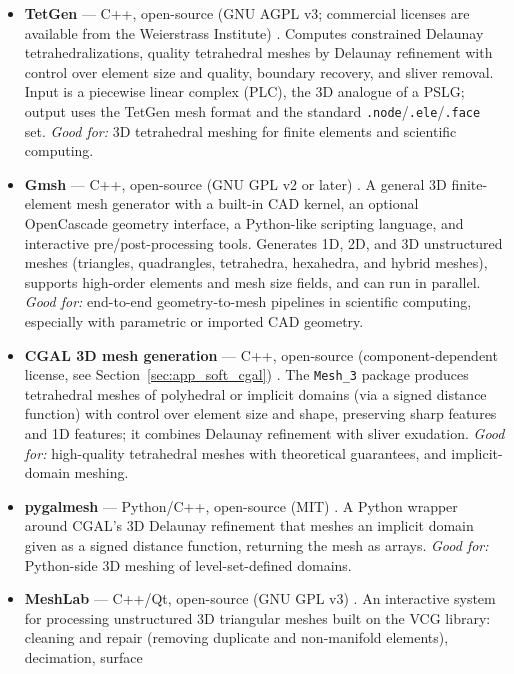\begin{itemize}
  \item \textbf{TetGen} --- C++, open-source (GNU AGPL v3; commercial
    licenses are available from the Weierstrass Institute)
    \cite{si2015}. Computes constrained Delaunay tetrahedralizations,
    quality tetrahedral meshes by Delaunay refinement with control over
    element size and quality, boundary recovery, and sliver removal.
    Input is a piecewise linear complex (PLC), the 3D analogue of a
    PSLG; output uses the TetGen mesh format and the standard
    \texttt{.node}/\texttt{.ele}/\texttt{.face} set.
    \emph{Good for:} 3D tetrahedral meshing for finite elements and
    scientific computing.
  \item \textbf{Gmsh} --- C++, open-source (GNU GPL v2 or later)
    \cite{geuzaine2009}. A general 3D finite-element mesh generator with
    a built-in CAD kernel, an optional OpenCascade geometry interface, a
    Python-like scripting language, and interactive pre/post-processing
    tools. Generates 1D, 2D, and 3D unstructured meshes (triangles,
    quadrangles, tetrahedra, hexahedra, and hybrid meshes), supports
    high-order elements and mesh size fields, and can run in parallel.
    \emph{Good for:} end-to-end geometry-to-mesh pipelines in scientific
    computing, especially with parametric or imported CAD geometry.
  \item \textbf{CGAL 3D mesh generation} --- C++, open-source
    (component-dependent license, see Section~\ref{sec:app_soft_cgal})
    \cite{cgalmanual}. The \texttt{Mesh\_3} package produces tetrahedral
    meshes of polyhedral or implicit domains (via a signed distance
    function) with control over element size and shape, preserving
    sharp features and 1D features; it combines Delaunay refinement
    with sliver exudation. \emph{Good for:} high-quality tetrahedral
    meshes with theoretical guarantees, and implicit-domain meshing.
  \item \textbf{pygalmesh} --- Python/C++, open-source (MIT)
    \cite{pygalmesh}. A Python wrapper around CGAL's 3D Delaunay
    refinement that meshes an implicit domain given as a signed distance
    function, returning the mesh as arrays. \emph{Good for:} Python-side
    3D meshing of level-set-defined domains.
  \item \textbf{MeshLab} --- C++/Qt, open-source (GNU GPL v3)
    \cite{meshllab}. An interactive system for processing unstructured
    3D triangular meshes built on the VCG library: cleaning and repair
    (removing duplicate and non-manifold elements), decimation, surface

\end{itemize}
